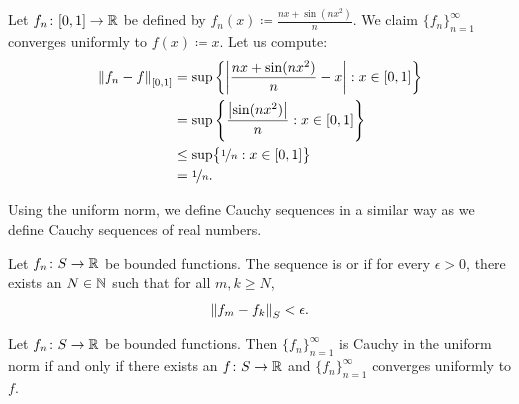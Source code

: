 \begin{example}
Let $f_n \colon [0,1] \to {\mathbb{R}}$ be defined by $f_n(x) \coloneqq \frac{nx+ \sin(nx^2)}{n}$.
We claim $\{ f_n \}_{n=1}^\infty$ converges uniformly to $f(x) \coloneqq x$.  Let us compute:
\begin{equation*}
\begin{split}
\left\lVert {f_n-f} \right\rVert_{[0,1]}
& =
\sup \left\{ \left\lvert {\frac{nx+ \sin(nx^2)}{n} - x} \right\rvert : x \in [0,1] \right\}
\\
& =
\sup \left\{ \frac{\left\lvert {\sin(nx^2)} \right\rvert}{n} : x \in [0,1] \right\}
\\
& \leq
\sup \bigl\{ \nicefrac{1}{n} : x \in [0,1] \bigr\}
\\
& = \nicefrac{1}{n}.
\end{split}
\end{equation*}
\end{example}

Using the uniform norm, we define Cauchy sequences in a similar way
as we define Cauchy sequences of real numbers.

\begin{defn}
Let $f_n \colon S \to {\mathbb{R}}$ be bounded functions.
The sequence is \emph{}
or \emph{}
if for every $\epsilon > 0$, there exists an $N \in {\mathbb{N}}$ such
that for all $m,k \geq N$,
\begin{equation*}
\left\lVert {f_m-f_k} \right\rVert_S < \epsilon .
\end{equation*}
\end{defn}

\begin{prop} \label{prop:uniformcauchy}
Let $f_n \colon S \to {\mathbb{R}}$ be bounded functions.
Then $\{ f_n \}_{n=1}^\infty$ is Cauchy in the uniform norm if and only if
there exists an $f \colon S \to {\mathbb{R}}$ and $\{ f_n \}_{n=1}^\infty$ converges
uniformly to $f$.
\end{prop}

